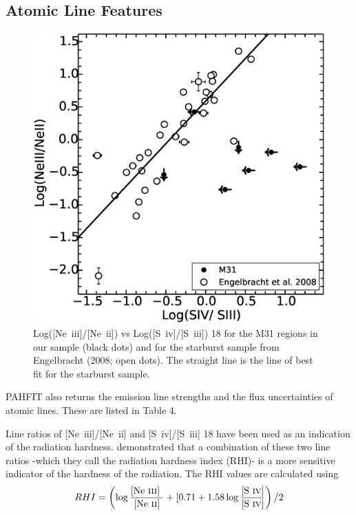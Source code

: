 \documentclass[useAMS,usenatbib,a4paper]{mn2e}
\begin{document}
\subsection{Atomic Line Features}
\begin{figure}

\centering
\includegraphics[scale=0.3]{./NevsS.eps}
\caption{ Log([Ne~{\sc iii}]/[Ne~{\sc ii}])  vs Log([S~{\sc iv}]/[S~{\sc iii}]) 18 for the M31 regions in our sample (black dots) and for the starburst sample from Engelbracht (2008; open dots). The straight line is the line of best fit for the starburst sample.}
\label{SvsNe}
\end{figure}

PAHFIT also returns the emission line strengths and the flux uncertainties of atomic lines. These are listed in Table 4.

	Line ratios of [Ne~{\sc iii}]/[Ne~{\sc ii}] and [S~{\sc iv}]/[S~{\sc iii}] 18 have been used as an indication of the radiation hardness. \citet{Engelbracht_2008} demonstrated that a combination of these two line ratios -which they call the radiation hardness index (RHI)- is a more sensitive indicator of the hardness of the radiation. The RHI values are calculated using
\vspace{5 mm}	
\begin{equation}
{RHI = \left( \log\frac{\textrm{[Ne~{\sc iii}] }}{\textrm{[Ne~{\sc ii}]}} + [0.71 + 1.58\log\frac{\textrm{{[S~{\sc iv}]}}}{\textrm{{[S~{\sc iv}]}}}\right) /2}
\vspace{5 mm}	
\end{equation}
\end{document}
